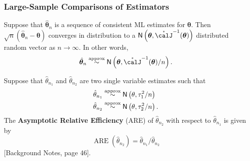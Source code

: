 \subsubsection*{Large-Sample Comparisons of Estimators}

\begin{thm} \label{thm: large_samp_est}
    Suppose that $\hat{\bm{\theta}}_n$ is a sequence of consistent ML estimates for $\bm{\theta}$. Then $\sqrt{n} \left( \hat{\bm{\theta}}_n - \bm{\theta} \right)$ converges in distribution to a $\Nor \left( \bm{\theta} , \mathring{\calJ}^{-1} (\bm{\theta}) \right)$ distributed random vector as $n \to \infty$. In other words,
    \begin{align*}
        \hat{\bm{\theta}}_n \overset{\text{approx}}{\sim} \Nor \left( \bm{\theta} , \mathring{\calJ}^{-1} (\bm{\theta}) / n \right) .
    \end{align*}
\end{thm}

\begin{defe} \label{defe: are}
    Suppose that $\hat{\theta}_{n_1}$ and $\hat{\theta}_{n_2}$ are two single variable estimates such that
    \begin{align*}
        \hat{\theta}_{n_1} & \overset{\text{approx}}{\sim} {\sf N} \left( \theta , \tau_1^2 / n \right)  \\
        \hat{\theta}_{n_2} & \overset{\text{approx}}{\sim} {\sf N} \left( \theta , \tau_2^2 / n \right).
    \end{align*}
    The {\bf Asymptotic Relative Efficiency} (ARE) of $\hat{\theta}_{n_2}$ with respect to $\hat{\theta}_{n_1}$ is given by
    \begin{equation*}
        \operatorname{ARE} (\hat{\theta}_{n_2}) = \hat{\theta}_{n_1} / \hat{\theta}_{n_2}
    \end{equation*}
    [Background Notes, page 46].
\end{defe}

